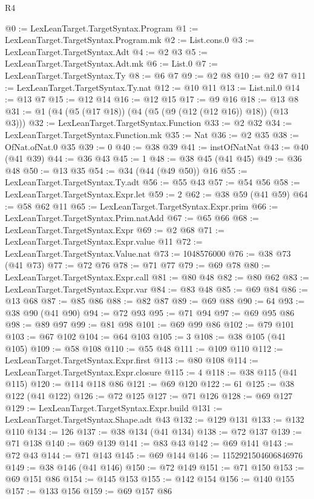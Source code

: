 \begin{lexlean}{R4}
\begin{coremodule}
@0 := LexLeanTarget.TargetSyntax.Program
@1 := LexLeanTarget.TargetSyntax.Program.mk
@2 := List.cons.{0}
@3 := LexLeanTarget.TargetSyntax.Adt
@4 := @2 @3
@5 := LexLeanTarget.TargetSyntax.Adt.mk
@6 := List.{0}
@7 := LexLeanTarget.TargetSyntax.Ty
@8 := @6 @7
@9 := @2 @8
@10 := @2 @7
@11 := LexLeanTarget.TargetSyntax.Ty.nat
@12 := @10 @11
@13 := List.nil.{0}
@14 := @13 @7
@15 := @12 @14
@16 := @12 @15
@17 := @9 @16
@18 := @13 @8
@31 := @1 (@4 (@5 (@17 @18)) (@4 (@5 (@9 (@12 (@12 @16)) @18)) (@13 @3)))
@32 := LexLeanTarget.TargetSyntax.Function
@33 := @2 @32
@34 := LexLeanTarget.TargetSyntax.Function.mk
@35 := Nat
@36 := @2 @35
@38 := OfNat.ofNat.{0} @35
@39 := 0
@40 := @38 @39
@41 := instOfNatNat
@43 := @40 (@41 @39)
@44 := @36 @43
@45 := 1
@48 := @38 @45 (@41 @45)
@49 := @36 @48
@50 := @13 @35
@54 := @34 (@44 (@49 @50)) @16
@55 := LexLeanTarget.TargetSyntax.Ty.adt
@56 := @55 @43
@57 := @54 @56
@58 := LexLeanTarget.TargetSyntax.Expr.let
@59 := 2
@62 := @38 @59 (@41 @59)
@64 := @58 @62 @11
@65 := LexLeanTarget.TargetSyntax.Expr.prim
@66 := LexLeanTarget.TargetSyntax.Prim.natAdd
@67 := @65 @66
@68 := LexLeanTarget.TargetSyntax.Expr
@69 := @2 @68
@71 := LexLeanTarget.TargetSyntax.Expr.value @11
@72 := LexLeanTarget.TargetSyntax.Value.nat
@73 := 1048576000
@76 := @38 @73 (@41 @73)
@77 := @72 @76
@78 := @71 @77
@79 := @69 @78
@80 := LexLeanTarget.TargetSyntax.Expr.call
@81 := @80 @48
@82 := @80 @62
@83 := LexLeanTarget.TargetSyntax.Expr.var
@84 := @83 @48
@85 := @69 @84
@86 := @13 @68
@87 := @85 @86
@88 := @82 @87
@89 := @69 @88
@90 := 64
@93 := @38 @90 (@41 @90)
@94 := @72 @93
@95 := @71 @94
@97 := @69 @95 @86
@98 := @89 @97
@99 := @81 @98
@101 := @69 @99 @86
@102 := @79 @101
@103 := @67 @102
@104 := @64 @103
@105 := 3
@108 := @38 @105 (@41 @105)
@109 := @58 @108
@110 := @55 @48
@111 := @109 @110
@112 := LexLeanTarget.TargetSyntax.Expr.first
@113 := @80 @108
@114 := LexLeanTarget.TargetSyntax.Expr.closure
@115 := 4
@118 := @38 @115 (@41 @115)
@120 := @114 @118 @86
@121 := @69 @120
@122 := 61
@125 := @38 @122 (@41 @122)
@126 := @72 @125
@127 := @71 @126
@128 := @69 @127
@129 := LexLeanTarget.TargetSyntax.Expr.build
@131 := LexLeanTarget.TargetSyntax.Shape.adt @43
@132 := @129 @131
@133 := @132 @110
@134 := 126
@137 := @38 @134 (@41 @134)
@138 := @72 @137
@139 := @71 @138
@140 := @69 @139
@141 := @83 @43
@142 := @69 @141
@143 := @72 @43
@144 := @71 @143
@145 := @69 @144
@146 := 1152921504606846976
@149 := @38 @146 (@41 @146)
@150 := @72 @149
@151 := @71 @150
@153 := @69 @151 @86
@154 := @145 @153
@155 := @142 @154
@156 := @140 @155
@157 := @133 @156
@159 := @69 @157 @86

\end{coremodule}
\end{lexlean}
